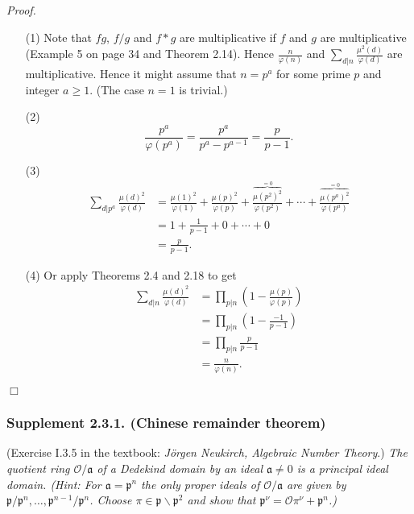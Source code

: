 \documentclass{article}
\begin{document}
\emph{Proof.}
\begin{enumerate}
\item[(1)]
  Note that $fg$, $f/g$ and $f * g$ are multiplicative if $f$ and $g$ are multiplicative
  (Example 5 on page 34 and Theorem 2.14).
  Hence $\frac{n}{\varphi(n)}$ and $\sum_{d|n} \frac{\mu^2(d)}{\varphi(d)}$
  are multiplicative.
  Hence it might assume that $n = p^a$ for some prime $p$ and integer $a \geq 1$.
  (The case $n=1$ is trivial.)

\item[(2)]
  \[
    \frac{p^a}{\varphi(p^a)}
    = \frac{p^a}{p^a - p^{a-1}}
    = \frac{p}{p-1}.
  \]

\item[(3)]
  \begin{align*}
    \sum_{d|p^a} \frac{\mu(d)^2}{\varphi(d)}
    &= \frac{\mu(1)^2}{\varphi(1)} + \frac{\mu(p)^2}{\varphi(p)}
      + \frac{\overbrace{\mu(p^2)^2}^{= 0}}{\varphi(p^2)} + \cdots
      + \frac{\overbrace{\mu(p^a)^2}^{=0}}{\varphi(p^a)} \\
    &= 1 + \frac{1}{p-1} + 0 + \cdots + 0 \\
    &= \frac{p}{p-1}.
  \end{align*}

\item[(4)]
  Or apply Theorems 2.4 and 2.18 to get
  \begin{align*}
    \sum_{d|n} \frac{\mu(d)^2}{\varphi(d)}
    &= \prod_{p|n} \left(1 - \frac{\mu(p)}{\varphi(p)} \right) \\
    &= \prod_{p|n} \left(1 - \frac{-1}{p-1} \right) \\
    &= \prod_{p|n} \frac{p}{p-1} \\
    &= \frac{n}{\varphi(n)}.
  \end{align*}
\end{enumerate}
$\Box$ \\



\subsubsection*{Supplement 2.3.1. (Chinese remainder theorem)}
(Exercise I.3.5 in the textbook: \emph{J\"orgen Neukirch, Algebraic Number Theory}.)
\emph{The quotient ring $\mathcal{O}/\mathfrak{a}$ of a Dedekind domain by
an ideal $\mathfrak{a} \neq 0$ is a principal ideal domain.
(Hint: For $\mathfrak{a} = \mathfrak{p}^n$ the only proper ideals of $\mathcal{O}/\mathfrak{a}$
are given by $\mathfrak{p}/\mathfrak{p}^n, \ldots, \mathfrak{p}^{n-1}/\mathfrak{p}^n$.
Choose $\pi \in \mathfrak{p} \smallsetminus \mathfrak{p}^2$
and show that $\mathfrak{p}^{\nu} = \mathcal{O}\pi^{\nu} + \mathfrak{p}^n$.)} \\
\end{document}
